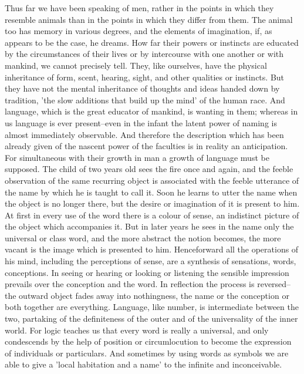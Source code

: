 Thus far we have been speaking of men, rather in the points in which
they resemble animals than in the points in which they differ from
them. The animal too has memory in various degrees, and the elements
of imagination, if, as appears to be the case, he dreams. How far their
powers or instincts are educated by the circumstances of their lives
or by intercourse with one another or with mankind, we cannot precisely
tell. They, like ourselves, have the physical inheritance of form,
scent, hearing, sight, and other qualities or instincts. But they
have not the mental inheritance of thoughts and ideas handed down by
tradition, 'the slow additions that build up the mind' of the human
race. And language, which is the great educator of mankind, is wanting
in them; whereas in us language is ever present--even in the infant the
latent power of naming is almost immediately observable. And therefore
the description which has been already given of the nascent power of
the faculties is in reality an anticipation. For simultaneous with their
growth in man a growth of language must be supposed. The child of two
years old sees the fire once and again, and the feeble observation of
the same recurring object is associated with the feeble utterance of the
name by which he is taught to call it. Soon he learns to utter the name
when the object is no longer there, but the desire or imagination of it
is present to him. At first in every use of the word there is a colour
of sense, an indistinct picture of the object which accompanies it. But
in later years he sees in the name only the universal or class word, and
the more abstract the notion becomes, the more vacant is the image
which is presented to him. Henceforward all the operations of his mind,
including the perceptions of sense, are a synthesis of sensations,
words, conceptions. In seeing or hearing or looking or listening the
sensible impression prevails over the conception and the word. In
reflection the process is reversed--the outward object fades away into
nothingness, the name or the conception or both together are everything.
Language, like number, is intermediate between the two, partaking of the
definiteness of the outer and of the universality of the inner world.
For logic teaches us that every word is really a universal, and only
condescends by the help of position or circumlocution to become the
expression of individuals or particulars. And sometimes by using words
as symbols we are able to give a 'local habitation and a name' to the
infinite and inconceivable.

